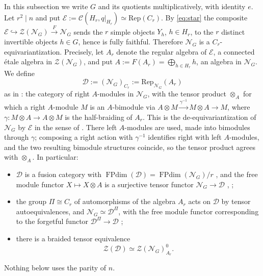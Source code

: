 \documentclass[10pt]{article}
\theoremstyle{plain}
\theoremstyle{definition}
\theoremstyle{plain}
\begin{document}
In this subsection we write $G$ and its quotients multiplicatively, with identity $e$. Let $r^{2}\mid n$ and put
$\mathcal{E}:=\mathcal{C}(H_r,q|_{H_r})\simeq\mathrm{Rep}(C_r)$.  By
\eqref{eq:star} the composite
$\mathcal{E}\hookrightarrow\mathcal{Z}(\mathcal{N}_G)\xrightarrow{F}\mathcal{N}_G$
sends the $r$ simple objects $Y_h$, $h\in H_r$, to the $r$ distinct invertible
objects $h\in G$, hence is fully faithful.  Therefore $\mathcal{N}_G$ is a
$C_r$-equivariantization.  Precisely, let $A_r$ denote the regular algebra of
$\mathcal{E}$, a connected \'etale algebra in $\mathcal{Z}(\mathcal{N}_G)$, and put
$A:=F(A_r)=\bigoplus_{h\in H_r}h$, an algebra in $\mathcal{N}_G$. We define
\[
\mathcal{D}:=(\mathcal{N}_G)_{C_r}:=\mathrm{Rep}_{\mathcal{N}_G}(A_r)
\]
as in \cite[Definition 3.17]{MR3039775}: the category of right $A$-modules in $\mathcal{N}_G$, with the tensor product $\otimes_A$ for which a right $A$-module $M$ is an $A$-bimodule via $A\otimes M\xrightarrow{\gamma^{-1}}M\otimes A\to M$, where $\gamma\colon M\otimes A\to A\otimes M$ is the half-braiding of $A_r$. This is the de-equivariantization of $\mathcal{N}_G$ by $\mathcal{E}$ in the sense of \cite[Section 4.2.4]{MR2609644}. There left $A$-modules are used, made into bimodules through $\gamma$; composing a right action with $\gamma^{-1}$ identifies right with left $A$-modules, and the two resulting bimodule structures coincide, so the tensor product \cite[(68)]{MR2609644} agrees with $\otimes_A$. In particular:
\begin{itemize}
\item $\mathcal{D}$ is a fusion category with $\operatorname{FPdim}(\mathcal{D})=\operatorname{FPdim}(\mathcal{N}_G)/r$ \cite[Remark 4.21 and Proposition 4.26]{MR2609644}, and the free module functor $X\mapsto X\otimes A$ is a surjective tensor functor $\mathcal{N}_G\to\mathcal{D}$ \cite[Section 4.2.6]{MR2609644}, \cite[Remark 3.19]{MR3039775};
\item the group $\Pi\cong C_r$ of automorphisms of the algebra $A_r$ acts on $\mathcal{D}$ by tensor autoequivalences, and $\mathcal{N}_G\simeq\mathcal{D}^{\Pi}$, with the free module functor corresponding to the forgetful functor $\mathcal{D}^\Pi\to\mathcal{D}$ \cite[Proposition 4.19 and Lemma 4.24]{MR2609644};
\item there is a braided tensor equivalence \cite[Theorem 3.20]{MR3039775}
\begin{equation}\label{eq:ZD}
  \mathcal{Z}(\mathcal{D})\simeq\mathcal{Z}(\mathcal{N}_G)^0_{A_r}.
\end{equation}
\end{itemize}
Nothing below uses the parity of $n$.
\end{document}
